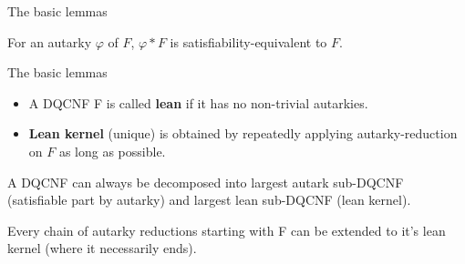 \documentclass[xcolor=table	]{beamer}
\begin{document}
\begin{frame}{The basic lemmas}
 \begin{lemma}
  For an autarky $\varphi$ of $F$, $\varphi \ast F$ is satisfiability-equivalent to $F$.
 \end{lemma}
{}
\end{frame}

\begin{frame}{The basic lemmas}
 \begin{itemize}
 \item A DQCNF F is called \textbf{lean} if it has no non-trivial autarkies. \newline
 	\pause 
 	
 \item	\textbf{Lean kernel} (unique) is obtained by repeatedly applying autarky-reduction on $F$ as long as possible. \newline
 \end{itemize}
  
 \pause 
  \begin{lemma}
  	A DQCNF can always be decomposed into largest
  	autark sub-DQCNF (satisfiable part by autarky) and largest lean sub-DQCNF (lean kernel). \newline
  	
 	Every chain of autarky reductions starting
 	with F can be extended \newline to it's lean kernel (where
 	it necessarily ends).
 \end{lemma}
\vspace{0.5cm}
 
\end{frame}
\end{document}
